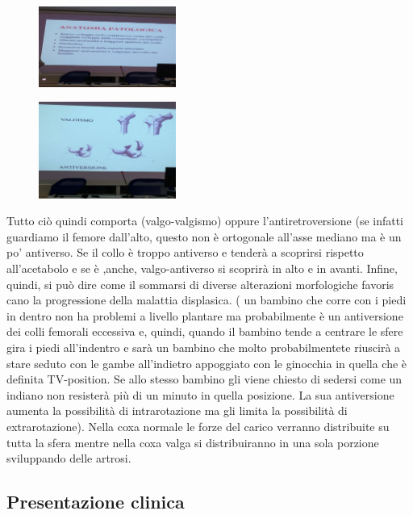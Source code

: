\begin{figure}[!ht]
\centering
\includegraphics[width=0.4\textwidth]{018/image3.jpeg}
\end{figure}

\begin{figure}[!ht]
\centering
\includegraphics[width=0.4\textwidth]{018/image4.jpeg}
\end{figure}

Tutto ciò quindi comporta (valgo-valgismo) oppure l'antiretroversione (se infatti guardiamo il femore dall'alto, questo non è ortogonale all'asse mediano ma è un po' antiverso. Se il collo è troppo antiverso e tenderà a scoprirsi rispetto all'acetabolo e se è ,anche, valgo-antiverso si scoprirà in alto e in avanti. Infine, quindi, si può dire come il sommarsi di diverse alterazioni morfologiche favoris cano la progressione della malattia displasica. ( un bambino che corre con i piedi in dentro non ha problemi a livello plantare ma probabilmente è un
antiversione dei colli femorali eccessiva e, quindi, quando il bambino tende a centrare le sfere gira i piedi all'indentro e sarà un bambino che molto probabilmentete riuscirà a stare seduto con le gambe all'indietro appoggiato con le ginocchia in quella che è definita TV-position. Se allo stesso bambino gli viene chiesto di sedersi come un indiano non resisterà più di un minuto in quella posizione. La sua antiversione aumenta la possibilità di intrarotazione ma gli limita la possibilità di extrarotazione). Nella coxa normale le forze del carico verranno distribuite su tutta la sfera mentre nella coxa valga si distribuiranno in una sola porzione sviluppando delle artrosi.

\subsection{Presentazione clinica}

